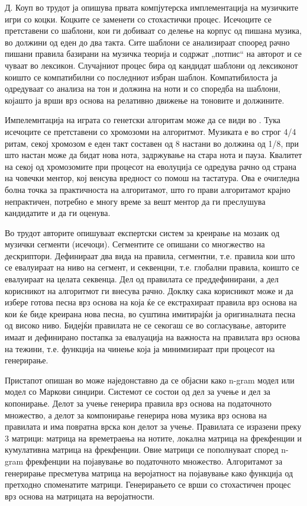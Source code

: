 Д. Коуп во трудот \cite{Cope1991} ја опишува првата компјутерска имплементација на музичките игри со коцки. Коцките се заменети со стохастички процес. Исечоците се претставени со шаблони, кои ги добиваат со делење на корпус од пишана музика, во должини од еден до два такта. Сите шаблони се анализираат спооред рачно пишани правила базирани на музичка теорија и содржат „потпис“ на авторот и се чуваат во лексикон. Случајниот процес бира од кандидат шаблони од лексиконот коишто се компатибилни со последниот избран шаблон. Компатибилоста ја одредуваат со анализа на тон и должина на ноти и со споредба на шаблони, којашто ја врши врз основа на релативно движење на тоновите и должините.

Импелемнтација на играта со генетски алгоритам може да се види во \cite{Biles1994}. Тука исечоците се претставени со хромозоми на алгоритмот. Музиката е во строг 4/4 ритам, секој хромозом е еден такт составен од 8 настани во должина од 1/8, при што настан може да бидат нова нота, задржување на стара нота и пауза. Квалитет на секој од хромозомите при процесот на еволуција се одредува рачно од страна на човечки ментор, кој венсува вредност со помош на тастатура. Ова е очигледна болна точка за практичноста на алгоритамот, што го прави алгоритамот крајно непрактичен, потребно е многу време за вешт ментор да ги преслушува кандидатите и да ги оценува. 

Во трудот \cite{Zils2001} авторите опишуваат експертски систем за креирање на мозаик од музички сегменти (исечоци). Сегментите се опишани со многжество на дескриптори. Дефинираат два вида на правила, сегментни, т.е. правила кои што се евалуираат на ниво на сегмент, и секвенцни, т.е. глобални правила, коишто се евалуираат на целата секвенца. Дел од правилата се преддефинирани, а дел корисникот на алгоритмот ги внесува рачно. Доклку сака корисникот може и да избере готова песна врз основа на која ќе се екстрахираат правила врз основа на кои ќе биде креирана нова песна, во суштина имитирајќи ја оригиналната песна од високо ниво. Бидејќи правилата не се секогаш се во согласување, авторите имаат и дефинирано постапка за евалуација на важноста на правилата врз основа на тежини, т.е. функција на чинење која ја минимизираат при процесот на генерирање.

Пристапот опишан во \cite{GarciaSalas2011} може наједонставно да се објасни како n-gram модел или модел со Маркови синџири. Системот се состои од дел за учење и дел за копонирање. Делот за учење генерира правила врз основа на податочното множество, а делот за компонирање генерира нова музика врз основа на правилата и има повратна врска кон делот за учење. Правилата се изразени преку 3 матрици: матрица на времетраења на нотите, локална матрица на фрекфенции и кумулативна матрица на фрекфенции. Овие матрици се пополнуваат според n-gram фрекфенции на појавување во податочното множество. Алгоритамот за генерирање пресметува матрица на веројатност на појавување како функција од претходно споменатите матрици. Генерирањето се врши со стохастичен процес врз основа на матрицата на веројатности. 

